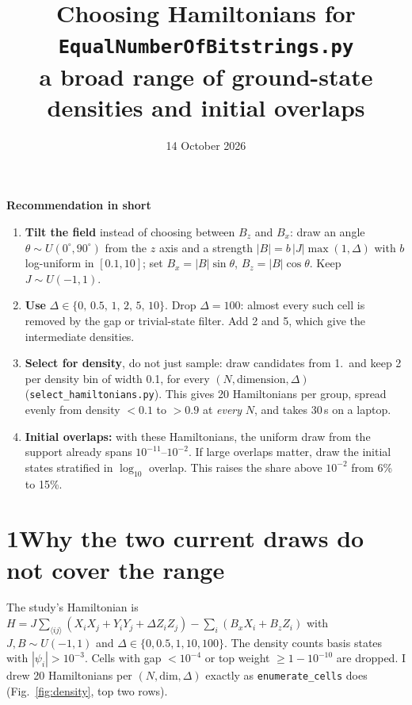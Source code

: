\documentclass[10pt,a4paper]{article}
\title{\vspace{-1.2cm}Choosing Hamiltonians for \texttt{EqualNumberOfBitstrings.py}\\[2pt]
\large a broad range of ground-state densities and initial overlaps}
\date{14 October 2026}
\author{}
\begin{document}
\maketitle
\vspace{-1.4cm}

\noindent\colorbox{boxbg}{\parbox{\dimexpr\linewidth-2\fboxsep}{%
\textbf{Recommendation in short}
\begin{enumerate}[leftmargin=1.4em]
\item \textbf{Tilt the field} instead of choosing between $B_z$ and $B_x$: draw an angle
  $\theta\sim U(0^\circ,90^\circ)$ from the $z$ axis and a strength
  $|B| = b\,|J|\max(1,\Delta)$ with $b$ log-uniform in $[0.1,10]$; set
  $B_x=|B|\sin\theta$, $B_z=|B|\cos\theta$. Keep $J\sim U(-1,1)$.
\item \textbf{Use} $\Delta\in\{0,\,0.5,\,1,\,2,\,5,\,10\}$. Drop $\Delta=100$: almost every such
  cell is removed by the gap or trivial-state filter. Add 2 and 5, which give the intermediate densities.
\item \textbf{Select for density}, do not just sample: draw candidates from 1.\ and keep
  2 per density bin of width 0.1, for every $(N,\text{dimension},\Delta)$
  (\texttt{select\_hamiltonians.py}). This gives 20 Hamiltonians per group, spread evenly from
  density $<0.1$ to $>0.9$ at \emph{every} $N$, and takes 30\,s on a laptop.
\item \textbf{Initial overlaps:} with these Hamiltonians, the uniform draw from the
  support already spans $10^{-11}$--$10^{-2}$. If large overlaps matter, draw the
  initial states stratified in $\log_{10}$ overlap. This raises the share above $10^{-2}$ from 6\% to 15\%.
\end{enumerate}}}

\section*{1\quad Why the two current draws do not cover the range}
The study's Hamiltonian is
$H = J\sum_{\langle ij\rangle}(X_iX_j+Y_iY_j+\Delta Z_iZ_j)-\sum_i(B_xX_i+B_zZ_i)$ with
$J,B\sim U(-1,1)$ and $\Delta\in\{0,0.5,1,10,100\}$. The density counts basis states with
$|\psi_i|>10^{-3}$. Cells with gap $<10^{-4}$ or top weight $\ge 1-10^{-10}$ are dropped.
I drew 20 Hamiltonians per $(N,\text{dim},\Delta)$ exactly as \texttt{enumerate\_cells} does
(Fig.~\ref{fig:density}, top two rows).
\end{document}
